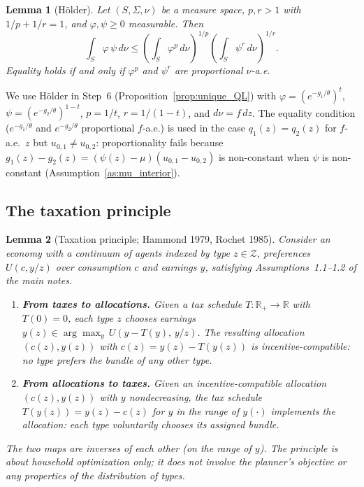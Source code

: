 \documentclass[12pt,a4paper]{article}
\theoremstyle{definition}
\theoremstyle{plain}
\newtheorem{lemma}{Lemma}[section]
\theoremstyle{remark}
\newcommand{\R}{\mathbb{R}}
\newcommand{\calZ}{\mathcal{Z}}
\begin{document}
\begin{lemma}[H\"{o}lder]
\label{lem:holder}
Let $(S, \Sigma, \nu)$ be a measure space, $p, r > 1$ with
$1/p + 1/r = 1$, and $\varphi, \psi \geq 0$ measurable.
Then
\begin{equation}
\label{eq:holder}
  \int_S \varphi\,\psi\,d\nu
  \leq
  \left(\int_S \varphi^p\,d\nu\right)^{\!1/p}
  \left(\int_S \psi^r\,d\nu\right)^{\!1/r}.
\end{equation}
Equality holds if and only if $\varphi^p$ and $\psi^r$
are proportional $\nu$-a.e.
\end{lemma}

We use H\"{o}lder in Step~6
(Proposition~\ref{prop:unique_QL}) with
$\varphi = (e^{-g_1/\theta})^t$,
$\psi = (e^{-g_2/\theta})^{1-t}$,
$p = 1/t$, $r = 1/(1-t)$, and $d\nu = f\,dz$.  The
equality condition ($e^{-g_1/\theta}$ and $e^{-g_2/\theta}$
proportional $f$-a.e.) is used in the case
$q_1(z) = q_2(z)$ for $f$-a.e.\ $z$ but
$u_{0,1} \neq u_{0,2}$: proportionality fails because
$g_1(z) - g_2(z) = (\psi(z)-\mu)(u_{0,1}-u_{0,2})$ is
non-constant when $\psi$ is non-constant
(Assumption~\ref{as:mu_interior}).



\subsection{The taxation principle}

\begin{lemma}[Taxation principle; Hammond 1979, Rochet 1985]
\label{lem:taxation_principle}
Consider an economy with a continuum of agents indexed by
type $z \in \calZ$, preferences $U(c, y/z)$ over
consumption $c$ and earnings $y$, satisfying
Assumptions~1.1--1.2 of the main notes.
\begin{enumerate}[label=(\roman*)]
\item \textbf{From taxes to allocations.}
  Given a tax schedule $T: \R_+ \to \R$ with $T(0) = 0$,
  each type $z$ chooses earnings
  $y(z) \in \arg\max_y\, U(y - T(y),\, y/z)$.  The
  resulting allocation $(c(z), y(z))$ with
  $c(z) = y(z) - T(y(z))$ is incentive-compatible:
  no type prefers the bundle of any other type.
\item \textbf{From allocations to taxes.}
  Given an incentive-compatible allocation $(c(z), y(z))$
  with $y$ nondecreasing, the tax schedule
  $T(y(z)) = y(z) - c(z)$ for $y$ in the range of
  $y(\cdot)$ implements the allocation: each type
  voluntarily chooses its assigned bundle.
\end{enumerate}
The two maps are inverses of each other (on the range of
$y$).  The principle is about household optimization only;
it does not involve the planner's objective or any
properties of the distribution of types.
\end{lemma}
\end{document}
